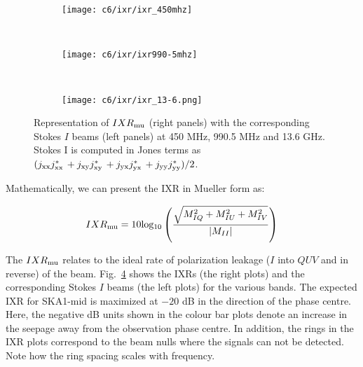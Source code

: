 \begin{figure}[H]
  \centering
     \begin{subfigure}[b]{1.0\textwidth}
                \texttt{[image: c6/ixr/ixr\_450mhz]}%
                \caption{}
                \label{fig:fg1a}
        \end{subfigure} \\
        \begin{subfigure}[b]{1.0\textwidth}
                \texttt{[image: c6/ixr/ixr990-5mhz]} %
                \caption{}
               \label{fig:fg1b}
        \end{subfigure} \\
        \begin{subfigure}[b]{1.0\textwidth}
                \texttt{[image: c6/ixr/ixr\_13-6.png]} %
                \caption{}
               \label{fig:fg1c}
        \end{subfigure} 
        \caption{Representation of $IXR_{\rm mu}$ (right panels) with the corresponding Stokes $I$ beams (left panels) at 450 MHz, 990.5 MHz and 13.6 GHz. Stokes I is computed in Jones terms as $(j_{\rm xx}j_{\rm xx}^{*}\, + j_{\rm xy}j_{\rm xy}^{*}\, + j_{\rm yx}j_{\rm yx}^{*}\, + j_{\rm yy}j_{\rm yy}^{*})/2$.}
    \label{fig:ixrbands}
  \end{figure} 

\noindent Mathematically, we can present the IXR in Mueller form as:

\begin{equation}  \label{eq:ixr}
 IXR_{\rm mu} = 10\mathrm{log_{10}}\left( \frac{\sqrt{M_{IQ}^2 +M_{IU}^2 + M_{IV}^2}}{\lvert  M_{II}  \rvert} \right)
\end{equation}

\noindent The $IXR_{\rm mu}$ relates to the ideal rate of polarization leakage ($I$ into $QUV$ and in reverse) of the beam. Fig.~\ref{fig:ixrbands} shows the IXRs (the right plots) and the corresponding Stokes $I$ beams (the left plots) for the various bands. The expected IXR for SKA1-mid is maximized at $-20$ dB in the direction of the phase centre. Here, the negative dB units shown in the colour bar plots denote an increase in the seepage away from the observation phase centre. In addition, the rings in the IXR plots correspond to the beam nulls where the signals can not be detected. Note how the ring spacing scales with frequency. 

